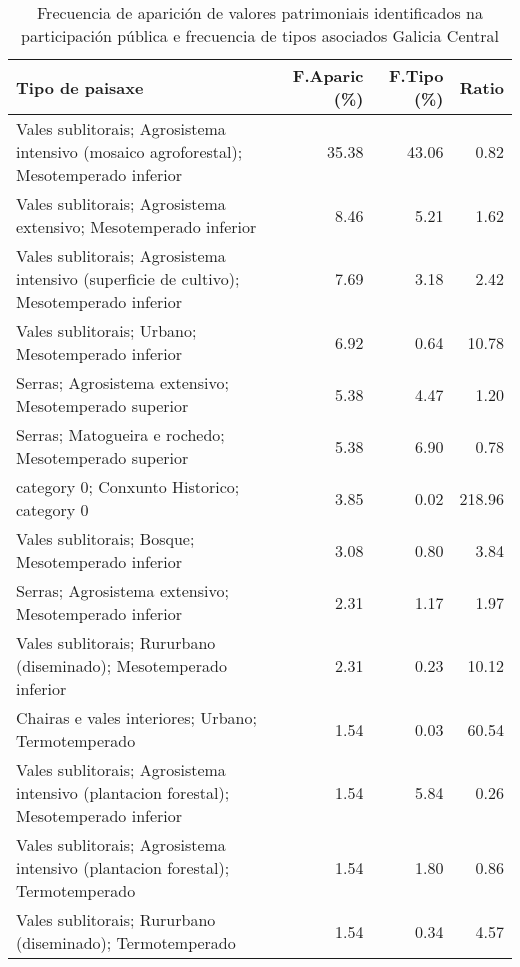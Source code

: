 \begin{table}[p]
\centering
\caption{Frecuencia de aparición de valores patrimoniais identificados na participación pública e frecuencia de tipos asociados Galicia Central} 
\label{vsixotpat7}
\begin{tabular}{lrrr}
  \hline
Tipo de paisaxe & F.Aparic (\%) & F.Tipo (\%) & Ratio \\ 
  \hline
Vales sublitorais; Agrosistema intensivo (mosaico agroforestal); Mesotemperado inferior & 35.38 & 43.06 & 0.82 \\ 
  Vales sublitorais; Agrosistema extensivo; Mesotemperado inferior & 8.46 & 5.21 & 1.62 \\ 
  Vales sublitorais; Agrosistema intensivo (superficie de cultivo); Mesotemperado inferior & 7.69 & 3.18 & 2.42 \\ 
  Vales sublitorais; Urbano; Mesotemperado inferior & 6.92 & 0.64 & 10.78 \\ 
  Serras; Agrosistema extensivo; Mesotemperado superior & 5.38 & 4.47 & 1.20 \\ 
  Serras; Matogueira e rochedo; Mesotemperado superior & 5.38 & 6.90 & 0.78 \\ 
  category 0; Conxunto Historico; category 0 & 3.85 & 0.02 & 218.96 \\ 
  Vales sublitorais; Bosque; Mesotemperado inferior & 3.08 & 0.80 & 3.84 \\ 
  Serras; Agrosistema extensivo; Mesotemperado inferior & 2.31 & 1.17 & 1.97 \\ 
  Vales sublitorais; Rururbano (diseminado); Mesotemperado inferior & 2.31 & 0.23 & 10.12 \\ 
  Chairas e vales interiores; Urbano; Termotemperado & 1.54 & 0.03 & 60.54 \\ 
  Vales sublitorais; Agrosistema intensivo (plantacion forestal); Mesotemperado inferior & 1.54 & 5.84 & 0.26 \\ 
  Vales sublitorais; Agrosistema intensivo (plantacion forestal); Termotemperado & 1.54 & 1.80 & 0.86 \\ 
  Vales sublitorais; Rururbano (diseminado); Termotemperado & 1.54 & 0.34 & 4.57 \\ 
   \hline
\end{tabular}
\end{table}
